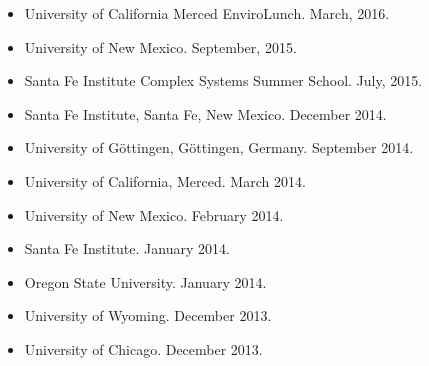 \documentclass[margin,line,12pt]{res}
\begin{document}
\begin{resume}
\begin{itemize}
\item University of California Merced EnviroLunch. March, 2016.

\item University of New Mexico. September, 2015.

\item Santa Fe Institute Complex Systems Summer School. July, 2015.

\item Santa Fe Institute, Santa Fe, New Mexico. December 2014.

\item University of G\"ottingen, G\"ottingen, Germany. September 2014.

\item University of California, Merced. March 2014.

\item University of New Mexico. February 2014.

\item Santa Fe Institute. January 2014.

\item Oregon State University. January 2014.

\item University of Wyoming. December 2013.

\item University of Chicago. December 2013.


\end{itemize}
\end{resume}
\end{document}
